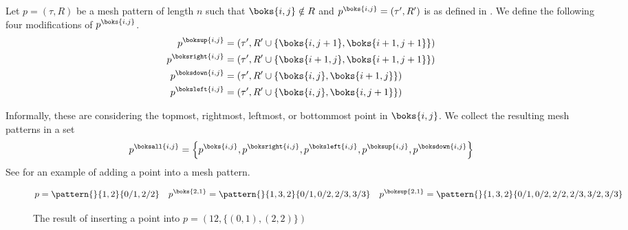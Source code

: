 \begin{definition}
Let \(p=(\tau,R)\) be a mesh pattern of length \(n\) such that \(\boks{i,j}\notin R\) and
\(p^\boks{i,j} = (\tau^\prime,R^\prime)\) is as defined in . We define
the following four modifications of \(p^\boks{i,j}\).
\begin{align*}
p^\boksup{i,j} &= (\tau^\prime, R^\prime \cup \{\boks{i,j+1},\boks{i+1,j+1}\})\\
p^\boksright{i,j} &= (\tau^\prime, R^\prime \cup \{\boks{i+1,j},\boks{i+1,j+1}\})\\
p^\boksdown{i,j} &= (\tau^\prime, R^\prime \cup \{\boks{i,j},\boks{i+1,j}\})\\
p^\boksleft{i,j} &= (\tau^\prime, R^\prime \cup \{\boks{i,j},\boks{i,j+1}\})\\
\end{align*}
\end{definition}
Informally, these are considering the topmost, rightmost, leftmost, or bottommost point in
\(\boks{i,j}\). We collect the resulting mesh patterns in a set
\begin{equation*}
p^\boksall{i,j}=\left\{
p^\boks{i,j},
p^\boksright{i,j},
p^\boksleft{i,j},
p^\boksup{i,j},
p^\boksdown{i,j}\right\}
\end{equation*}
See  for an example of adding a point into a mesh pattern.

\begin{figure}
\begin{equation*}
p = \pattern{}{1,2}{0/1,2/2} \quad
p^\boks{2,1}= \pattern{}{1,3,2}{0/1,0/2,2/3,3/3}
\quad
p^\boksup{2,1}
= \pattern{}{1,3,2}{0/1,0/2,2/2,2/3,3/2,3/3}
\end{equation*}
\caption{The result of inserting a point into \(p=(12,\{(0,1),(2,2)\})\)}
\label{fig:addp}
\end{figure}

